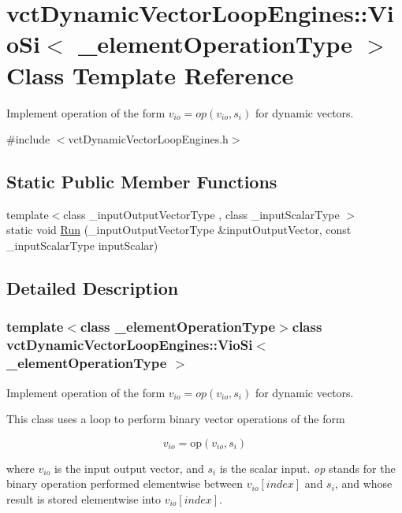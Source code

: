 \hypertarget{classvct_dynamic_vector_loop_engines_1_1_vio_si}{\section{vct\-Dynamic\-Vector\-Loop\-Engines\-:\-:Vio\-Si$<$ \-\_\-element\-Operation\-Type $>$ Class Template Reference}
\label{classvct_dynamic_vector_loop_engines_1_1_vio_si}
}


Implement operation of the form $ v_{io} = op(v_{io}, s_i)$ for dynamic vectors.  




{\ttfamily \#include $<$vct\-Dynamic\-Vector\-Loop\-Engines.\-h$>$}

\subsection*{Static Public Member Functions}
\begin{DoxyCompactItemize}
\item 
{\footnotesize template$<$class \-\_\-input\-Output\-Vector\-Type , class \-\_\-input\-Scalar\-Type $>$ }\\static void \hyperlink{classvct_dynamic_vector_loop_engines_1_1_vio_si_af3d43b7dd840e50ee26aa953c1312971}{Run} (\-\_\-input\-Output\-Vector\-Type \&input\-Output\-Vector, const \-\_\-input\-Scalar\-Type input\-Scalar)
\end{DoxyCompactItemize}


\subsection{Detailed Description}
\subsubsection*{template$<$class \-\_\-element\-Operation\-Type$>$class vct\-Dynamic\-Vector\-Loop\-Engines\-::\-Vio\-Si$<$ \-\_\-element\-Operation\-Type $>$}

Implement operation of the form $ v_{io} = op(v_{io}, s_i)$ for dynamic vectors. 

This class uses a loop to perform binary vector operations of the form

\[ v_{io} = \mathrm{op}(v_{io}, s_{i}) \]

where $v_{io}$ is the input output vector, and $s_{i}$ is the scalar input. {\itshape op} stands for the binary operation performed elementwise between $v_{io}[index]$ and $s_{i}$, and whose result is stored elementwise into $v_{io}[index]$.


